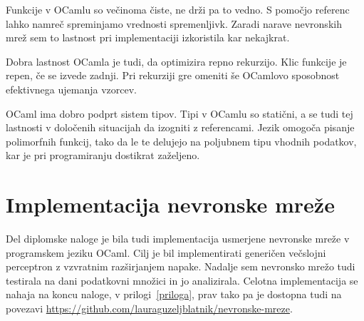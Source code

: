 \documentclass[mat1]{fmfdelo}
\begin{document}
Funkcije v OCamlu so večinoma čiste, ne drži pa to vedno. S pomočjo referenc lahko namreč spreminjamo vrednosti spremenljivk. Zaradi narave nevronskih mrež sem to lastnost pri implementaciji izkoristila kar nekajkrat.

Dobra lastnost OCamla je tudi, da optimizira repno rekurzijo. Klic funkcije je repen, če se izvede zadnji. Pri rekurziji gre omeniti še OCamlovo sposobnost efektivnega ujemanja vzorcev. 

OCaml ima dobro podprt sistem tipov. Tipi v OCamlu so statični, a se tudi tej lastnosti v določenih situacijah da izogniti z referencami. Jezik omogoča pisanje polimorfnih funkcij, tako da le te delujejo na poljubnem tipu vhodnih podatkov, kar je pri programiranju dostikrat zaželjeno. 
%
%
%
\section{Implementacija nevronske mreže}
Del diplomske naloge je bila tudi implementacija usmerjene nevronske mreže v programskem jeziku OCaml. Cilj je bil implementirati generičen večslojni perceptron z vzvratnim razširjanjem napake. Nadalje sem nevronsko mrežo tudi testirala na dani podatkovni množici in jo analizirala. Celotna implementacija se nahaja na koncu naloge, v prilogi~\ref{priloga}, prav tako pa je dostopna tudi na povezavi \url{https://github.com/lauraguzeljblatnik/nevronske-mreze}.
%
\end{document}
